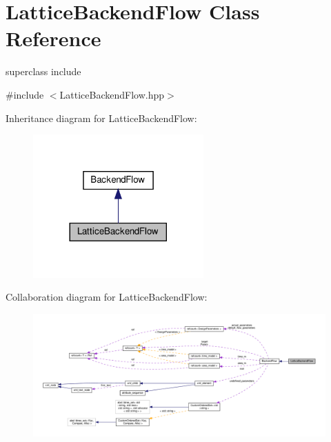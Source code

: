 \hypertarget{classLatticeBackendFlow}{}\section{Lattice\+Backend\+Flow Class Reference}
\label{classLatticeBackendFlow}


superclass include  




{\ttfamily \#include $<$Lattice\+Backend\+Flow.\+hpp$>$}



Inheritance diagram for Lattice\+Backend\+Flow\+:
\nopagebreak
\begin{figure}[H]
\begin{center}
\leavevmode
\includegraphics[width=185pt]{d9/d45/classLatticeBackendFlow__inherit__graph}
\end{center}
\end{figure}


Collaboration diagram for Lattice\+Backend\+Flow\+:
\nopagebreak
\begin{figure}[H]
\begin{center}
\leavevmode
\includegraphics[width=350pt]{d3/de9/classLatticeBackendFlow__coll__graph}
\end{center}
\end{figure}
